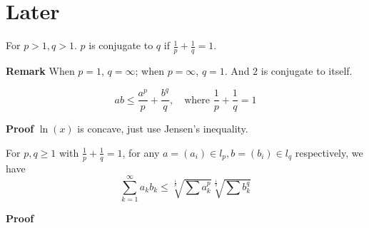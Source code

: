\documentclass[main.tex]{subfiles}
\begin{document}
\pagestyle{plain}
\setcounter{chapter}{1}

\chapter{Later}
\label{chap:chapter1}

\begin{definition}
    For $p>1, q>1$. $p$ is conjugate to $q$ if $\frac{1}{p} + \frac{1}{q} = 1$.
\end{definition}
\par \noindent \textbf{Remark} When $p = 1$, $q = \infty$; when $p = \infty$, $q = 1$. And $2$ is conjugate to itself. 
\begin{theorem}
    \begin{equation}
        ab \le \dfrac{a^p}{p} + \frac{b^q}{q}, \quad \text{where } \frac{1}{p} + \frac{1}{q} = 1 
    \end{equation}
\end{theorem}
\par \noindent \textbf{Proof} $\ln(x)$ is concave, just use Jensen's inequality.

\begin{theorem}
    For $p, q \ge 1$ with $\frac{1}{p} + \frac{1}{q} = 1$, for any $a = (a_i)\in l_p, b = (b_i) \in l_q$ respectively, we have \[ \sum_{k=1}^{\infty} a_k b_k \le \sqrt[\frac{1}{p}]{\sum a_k^p} \sqrt[\frac{1}{q}]{\sum b_k^q}  \]
\end{theorem}
\par \noindent \textbf{Proof} 
\end{document}

